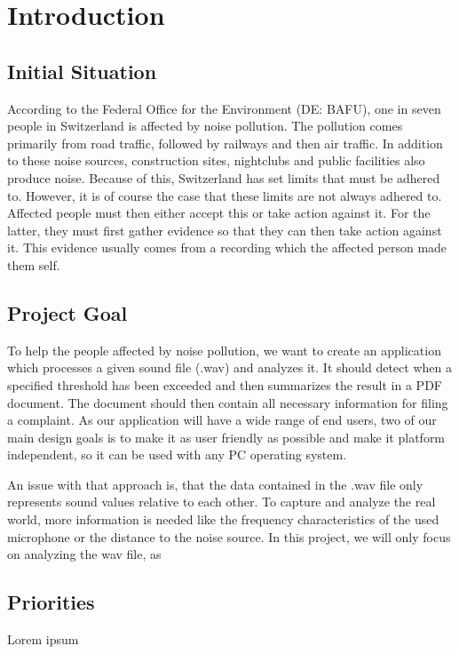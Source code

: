 \section{Introduction}

\subsection{Initial Situation}

According to the Federal Office for the Environment (DE: BAFU), one in seven people in Switzerland is affected by noise pollution.
The pollution comes primarily from road traffic, followed by railways and then air traffic.
In addition to these noise sources, construction sites, nightclubs and public facilities also produce noise.
Because of this, Switzerland has set limits that must be adhered to.
However, it is of course the case that these limits are not always adhered to.
Affected people must then either accept this or take action against it.
For the latter, they must first gather evidence so that they can then take action against it.
This evidence usually comes from a recording which the affected person made them self.

\subsection{Project Goal}
To help the people affected by noise pollution, we want to create an application which processes a given sound file (.wav)
and analyzes it.
It should detect when a specified threshold has been exceeded and then summarizes the result in a PDF document.
The document should then contain all necessary information for filing a complaint.
As our application will have a wide range of end users, two of our main design goals is to make it as user friendly as possible
and make it platform independent, so it can be used with any PC operating system.

\newline
An issue with that approach is, that the data contained in the .wav file only represents sound values relative to each other.
To capture and analyze the real world, more information is needed like the frequency characteristics of the used microphone or
the distance to the noise source.
In this project, we will only focus on analyzing the wav file, as

\subsection{Priorities}
Lorem ipsum




